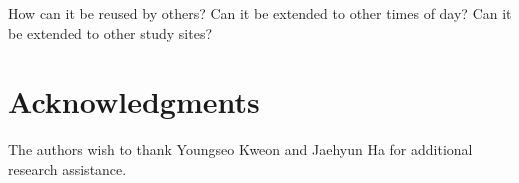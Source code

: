 \documentclass[12pt,letterpaper]{article} %
\begin{document}
    How can it be reused by others?
    Can it be extended to other times of day?
    Can it be extended to other study sites?

    \section*{Acknowledgments}

    The authors wish to thank Youngseo Kweon and Jaehyun Ha for additional research assistance.


    \setlength{\bibsep}{0.00cm plus 0.05cm} %
    
    
\end{document}
